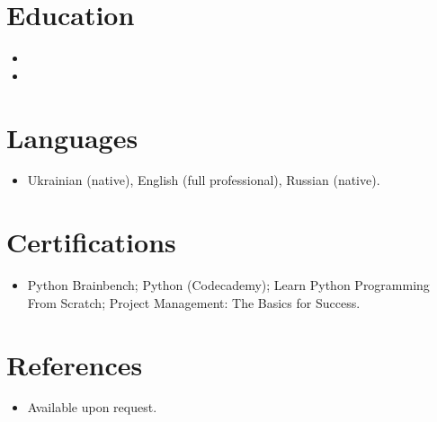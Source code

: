 \documentclass[11pt,a4paper,sans]{moderncv}
\begin{document}

\section{Education}
\vspace{1pt}
\begin{itemize}

\item{}

\vspace{3pt}

\item{}

\end{itemize}


\section{Languages}
\vspace{1pt}
\begin{itemize}
\item Ukrainian (native), English (full professional), Russian (native).
\end{itemize}


\section{Certifications}
\vspace{1pt}
\begin{itemize}
\item Python Brainbench; Python (Codecademy); Learn Python Programming From Scratch; Project Management: The Basics for Success.
\end{itemize}


\section{References}
\vspace{1pt}
\begin{itemize}
\item{Available upon request.}
\end{itemize}
\end{document}
